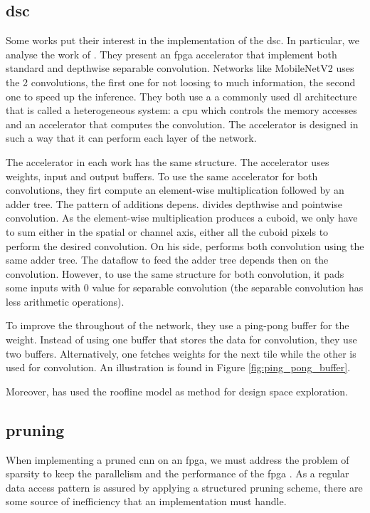 \subsection{dsc}
%
%
Some works put their interest in the implementation of the \acrshort{dsc}. In particular, we analyse the work of \textcite{bai_cnn_2018, liu_fpga-based_2019}. They present an \acrshort{fpga} accelerator that implement both standard and depthwise separable convolution. Networks like MobileNetV2 uses the 2 convolutions, the first one for not loosing to much information, the second one to speed up the inference. They both use a a commonly used \acrshort{dl} architecture that is called a heterogeneous system: a \acrshort{cpu} which controls the memory accesses and an accelerator that computes the convolution. The accelerator is designed in such a way that it can perform each layer of the network.

The accelerator in each work has the same structure. The accelerator uses weights, input and output buffers. To use the same accelerator for both convolutions, they firt compute an element-wise multiplication followed by an adder tree. The pattern of additions depens. \textcite{bai_cnn_2018} divides depthwise and pointwise convolution. As the element-wise multiplication produces a cuboid, we only have to sum either in the spatial or channel axis, either all the cuboid pixels to perform the desired convolution. On his side, \textcite{liu_fpga-based_2019} performs both convolution using the same adder tree. The dataflow to feed the adder tree depends then on the convolution. However, to use the same structure for both convolution, it pads some inputs with 0 value for separable convolution (the separable convolution has less arithmetic operations).

To improve the throughout of the network, they use a ping-pong buffer for the weight. Instead of using one buffer that stores the data for convolution, they use two buffers. Alternatively, one fetches weights for the next tile while the other is used for convolution. An illustration is found in Figure \ref{fig:ping_pong_buffer}.

Moreover, \textcite{liu_fpga-based_2019} has used the roofline model as method for design space exploration.
%
%
\subsection{pruning}
%
%
When implementing a pruned \acrshort{cnn} on an \acrshort{fpga}, we must address the problem of sparsity to keep the parallelism and the performance of the \acrshort{fpga} \cite{zhu_efficient_2020}. As a regular data access pattern is assured by applying a structured pruning scheme, there are some source of inefficiency that an implementation must handle.

